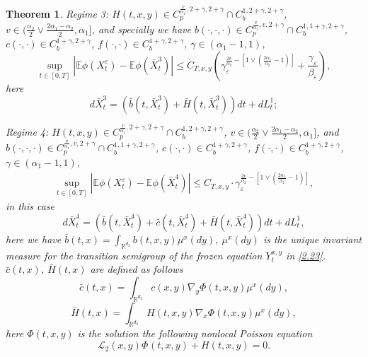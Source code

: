 \documentclass[11pt,reqno]{amsart}
\newtheorem{theorem}{\indent Theorem}[section]
\numberwithin{equation}{section}
\begin{document}
\begin{theorem}
	Regime 3:  $H(t,x,y)\in C_{p}^{\frac{v}{\alpha_{1}},2+\gamma,2+\gamma}\cap C_{b}^{1,2+\gamma,2+\gamma}$, $v\in ( \frac{\alpha_{2}}{2}\vee \frac{2\alpha_{1}-\alpha_{2}}{2}  ,\alpha_{1}]$, and specially we have $b(\cdot,\cdot,\cdot)\in C_{p}^{\frac{v}{\alpha_{1}},v,2+\gamma}\cap C_{b}^{1,1+\gamma,2+\gamma}$, $c(\cdot,\cdot)\in C_{b}^{1+\gamma,2+\gamma}$, $f(\cdot,\cdot)\in C_{b}^{1+\gamma,2+\gamma}$,   $\gamma\in (\alpha_{1}-1,1)$, 
	\begin{equation}\nonumber
		\sup_{t\in [0,T]}|\mathbb{E}\phi(X_{t}^{\varepsilon})-\mathbb{E}\phi(\bar{X}^{3}_{t})| \leq  C_{T,x,y}\left( \gamma_{\varepsilon}^{\frac{2v}{\alpha_{2}}-\left[ 1\vee \left( \frac{2\alpha_{1}}{\alpha_{2}}-1\right)   \right] }+\frac{\gamma_{\varepsilon}}{\beta_{\varepsilon}}\right)  ,
	\end{equation}
	here
	\begin{equation}\nonumber
		d\bar{X}^{3}_{t}=(\bar{b}(t,\bar{X}^{3}_{t})+\bar{H}(t,\bar{X}^{3}_{t}))dt+dL_{t}^{1};
	\end{equation}
	
	
	Regime 4:  $H(t,x,y)\in C_{p}^{\frac{v}{\alpha_{1}},2+\gamma,2+\gamma}\cap C_{b}^{1,2+\gamma,2+\gamma}$,  $v\in ( \frac{\alpha_{2}}{2}\vee \frac{2\alpha_{1}-\alpha_{2}}{2}  ,\alpha_{1}]$, and  $b(\cdot,\cdot,\cdot)\in C_{p}^{\frac{v}{\alpha_{1}},v,2+\gamma}\cap C_{b}^{1,1+\gamma,2+\gamma}$, $c(\cdot,\cdot)\in C_{b}^{1+\gamma,2+\gamma}$, $f(\cdot,\cdot)\in C_{b}^{1+\gamma,2+\gamma}$,   $\gamma\in (\alpha_{1}-1,1)$, 
	\begin{equation}\nonumber
		\begin{split}
			\sup_{t\in [0,T]}|\mathbb{E}\phi(X_{t}^{\varepsilon})-\mathbb{E}\phi(\bar{X}^{4}_{t})|\leq C_{T,x,y}\cdot \gamma_{\varepsilon}^{\frac{2v}{\alpha_{2}}-\left[ 1\vee \left( \frac{2\alpha_{1}}{\alpha_{2}}-1\right)   \right] },
		\end{split}
	\end{equation}
	in this case
	\begin{equation}\nonumber
		d\bar{X}^{4}_{t}=(\bar{b}(t,\bar{X}^{4}_{t})+\bar{c}(t,\bar{X}^{4}_{t})+\bar{H}(t,\bar{X}^{4}_{t}))dt+dL_{t}^{1},
	\end{equation} 
	here we have  $\bar{b}(t,x)=\int_{\mathbb{R}^{d_{2}}}b(t,x,y)\mu^{x}(dy)$, $\mu^{x}(dy)$ is the unique invariant measure for the transition semigroup of the frozen equation $Y^{x,y}_{t}$ in \eqref{2.23}.
	$\bar{c}(t,x)$, $\bar{H}(t,x)$ are defined as follows
	\begin{equation}\label{2.36}
			\bar{c}(t,x)=\int_{\mathbb{R}^{ d_{2}}}c(x,y)\nabla_{y}\Phi(t,x,y)\mu^{x}(dy),
	\end{equation}
	\begin{equation}\label{2.37}
\bar{H}(t,x)=\int_{\mathbb{R}^{ d_{2}}}H(t,x,y)\nabla_{x}\Phi(t,x,y)\mu^{x}(dy),
	\end{equation}
	here $\Phi(t,x,y)$ is the solution the  following nonlocal Poisson equation
	\begin{equation}\label{2.26-2}
		\mathcal{L}_{2}(x,y)\Phi_{}(t,x,y)+H(t,x,y)=0.
	\end{equation}
\end{theorem}
\end{document}
